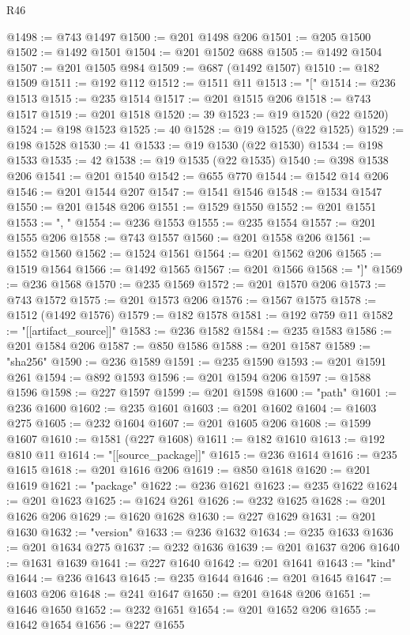 \begin{lexlean}{R46}
\begin{coremodule}
@1498 := @743 @1497
@1500 := @201 @1498 @206
@1501 := @205 @1500
@1502 := @1492 @1501
@1504 := @201 @1502 @688
@1505 := @1492 @1504
@1507 := @201 @1505 @984
@1509 := @687 (@1492 @1507)
@1510 := @182 @1509
@1511 := @192 @112
@1512 := @1511 @11
@1513 := "["
@1514 := @236 @1513
@1515 := @235 @1514
@1517 := @201 @1515 @206
@1518 := @743 @1517
@1519 := @201 @1518
@1520 := 39
@1523 := @19 @1520 (@22 @1520)
@1524 := @198 @1523
@1525 := 40
@1528 := @19 @1525 (@22 @1525)
@1529 := @198 @1528
@1530 := 41
@1533 := @19 @1530 (@22 @1530)
@1534 := @198 @1533
@1535 := 42
@1538 := @19 @1535 (@22 @1535)
@1540 := @398 @1538 @206
@1541 := @201 @1540
@1542 := @655 @770
@1544 := @1542 @14 @206
@1546 := @201 @1544 @207
@1547 := @1541 @1546
@1548 := @1534 @1547
@1550 := @201 @1548 @206
@1551 := @1529 @1550
@1552 := @201 @1551
@1553 := ", "
@1554 := @236 @1553
@1555 := @235 @1554
@1557 := @201 @1555 @206
@1558 := @743 @1557
@1560 := @201 @1558 @206
@1561 := @1552 @1560
@1562 := @1524 @1561
@1564 := @201 @1562 @206
@1565 := @1519 @1564
@1566 := @1492 @1565
@1567 := @201 @1566
@1568 := "]"
@1569 := @236 @1568
@1570 := @235 @1569
@1572 := @201 @1570 @206
@1573 := @743 @1572
@1575 := @201 @1573 @206
@1576 := @1567 @1575
@1578 := @1512 (@1492 @1576)
@1579 := @182 @1578
@1581 := @192 @759 @11
@1582 := "[[artifact_source]]"
@1583 := @236 @1582
@1584 := @235 @1583
@1586 := @201 @1584 @206
@1587 := @850 @1586
@1588 := @201 @1587
@1589 := "sha256"
@1590 := @236 @1589
@1591 := @235 @1590
@1593 := @201 @1591 @261
@1594 := @892 @1593
@1596 := @201 @1594 @206
@1597 := @1588 @1596
@1598 := @227 @1597
@1599 := @201 @1598
@1600 := "path"
@1601 := @236 @1600
@1602 := @235 @1601
@1603 := @201 @1602
@1604 := @1603 @275
@1605 := @232 @1604
@1607 := @201 @1605 @206
@1608 := @1599 @1607
@1610 := @1581 (@227 @1608)
@1611 := @182 @1610
@1613 := @192 @810 @11
@1614 := "[[source_package]]"
@1615 := @236 @1614
@1616 := @235 @1615
@1618 := @201 @1616 @206
@1619 := @850 @1618
@1620 := @201 @1619
@1621 := "package"
@1622 := @236 @1621
@1623 := @235 @1622
@1624 := @201 @1623
@1625 := @1624 @261
@1626 := @232 @1625
@1628 := @201 @1626 @206
@1629 := @1620 @1628
@1630 := @227 @1629
@1631 := @201 @1630
@1632 := "version"
@1633 := @236 @1632
@1634 := @235 @1633
@1636 := @201 @1634 @275
@1637 := @232 @1636
@1639 := @201 @1637 @206
@1640 := @1631 @1639
@1641 := @227 @1640
@1642 := @201 @1641
@1643 := "kind"
@1644 := @236 @1643
@1645 := @235 @1644
@1646 := @201 @1645
@1647 := @1603 @206
@1648 := @241 @1647
@1650 := @201 @1648 @206
@1651 := @1646 @1650
@1652 := @232 @1651
@1654 := @201 @1652 @206
@1655 := @1642 @1654
@1656 := @227 @1655

\end{coremodule}
\end{lexlean}
